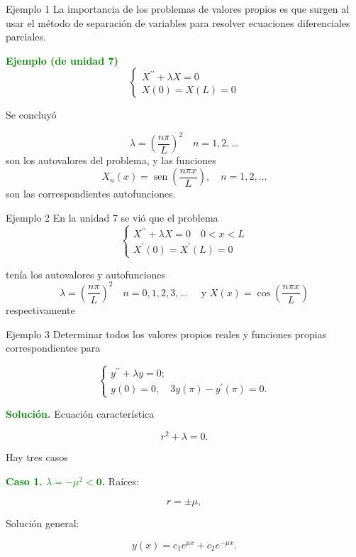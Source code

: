 \documentclass[xcolor=dvipsnames,a4paper,10pt,handout]{beamer}
\renewcommand{\textbf}[1]{\textcolor{green}{\bfseries #1}}
\begin{document}
\begin{frame}{ Ejemplo 1}
\onslide<+->
La importancia de los problemas de valores propios es que surgen al usar el método de separación de variables para resolver ecuaciones diferenciales parciales.
\onslide<+->

\textbf{Ejemplo (de unidad 7)}
$$
\left\{\begin{array}{r}
X^{\prime \prime}+\lambda X=0 \\
X(0)=X(L)=0
\end{array}\right.
$$

Se concluyó


$$
\lambda=\left(\frac{n \pi}{L}\right)^{2} \quad n=1,2, \ldots
$$
son los autovalores del problema, y las funciones
$$
X_{n}(x)=\operatorname{sen}\left(\frac{n \pi x}{L}\right), \quad n=1,2, \ldots
$$
son las correspondientes autofunciones.
\end{frame}


 

\begin{frame}{ Ejemplo 2}
En la unidad 7 se vió que el problema 
$$
\left\{\begin{array}{l}
X^{\prime \prime}+\lambda X=0\quad 0<x<L \\
X^{\prime}(0)=X^{\prime}(L)=0
\end{array} \right.
$$

tenía los autovalores y autofunciones 
$$
\lambda=\left(\frac{n \pi}{L}\right)^{2} \quad n=0,1,2,3, \ldots \quad \text { y } X(x)=\cos \left(\frac{n \pi x}{L}\right)
$$
respectivamente 



\end{frame}


 

\begin{frame}{Ejemplo 3}
\onslide<+->
 Determinar todos los valores propios reales y funciones propias correspondientes para
 
 $$
\left\{\begin{array}{l}
            y^{\prime \prime}+\lambda y=0;\\
            y(0)=0, \quad 3 y(\pi)-y^{\prime}(\pi)=0.
\end{array} \right.
$$
\onslide<+->

\textbf{Solución.} Ecuación característica 

$$r^{2}+\lambda=0.$$

Hay tres casos

\textbf{Caso 1. $\lambda=-\mu^{2}<\mathbf{0}$.} Raíces:

$$r=\pm \mu,$$

Solución general:

$$y(x)=c_{1} e^{\mu x}+c_{2} e^{-\mu x}.$$ 
\end{frame}
\end{document}
